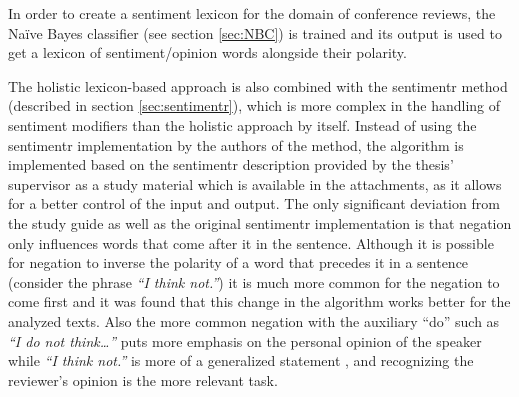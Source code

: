  In order to create a sentiment lexicon for the domain of conference reviews, the Na\"ive Bayes classifier (see section \ref{sec:NBC}) is trained and its output is used to get a lexicon of sentiment/opinion words alongside their polarity. 

The holistic lexicon-based approach is also combined with the sentimentr method (described in section \ref{sec:sentimentr}), which is more complex in the handling of sentiment modifiers than the holistic approach by itself. Instead of using the sentimentr implementation by the authors of the method, the algorithm is implemented based on the sentimentr description provided by the thesis' supervisor as a study material which is available in the attachments, as it allows for a better control of the input and output. The only significant deviation from the study guide as well as the original sentimentr implementation is that negation only influences words that come after it in the sentence. Although it is possible for negation to inverse the polarity of a word that precedes it in a sentence (consider the phrase \textit{``I think not.''}) it is much more common for the negation to come first and it was found that this change in the algorithm works better for the analyzed texts. Also the more common negation with the auxiliary ``do'' such as \textit{``I do not think\ldots''} puts more emphasis on the personal opinion of the speaker while \textit{``I think not.''} is more of a generalized statement \cite{do_not}, and recognizing the reviewer's opinion is the more relevant task.

